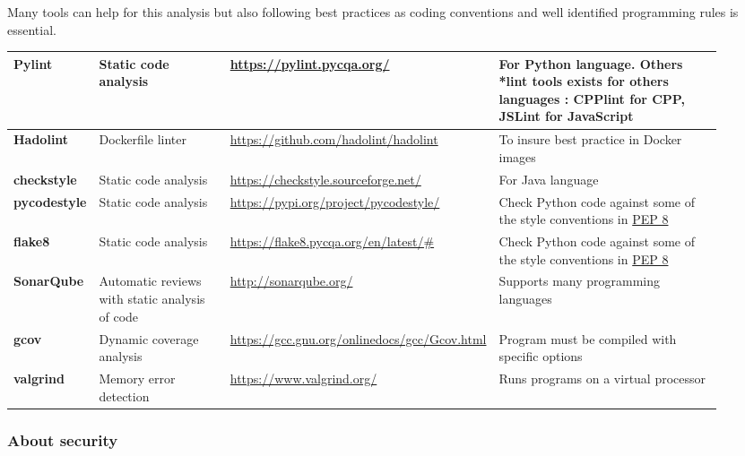 Many tools can help for this analysis but also following best
practices as coding conventions and well identified programming rules
is essential.

\begin{center}
    \tabletail{\hline}
    \label{tab:tools_pack}
    \small
    \begin{supertabular}{|p{0.12\linewidth}|p{0.2\linewidth}|p{0.25\linewidth}|p{0.35\linewidth}|} \hline
    \textbf{Pylint} & Static code analysis & \url{https://pylint.pycqa.org/}
    & For Python language. Others *lint tools exists for others
    languages : CPPlint for CPP, JSLint for JavaScript \\ \hline
    \textbf{Hadolint} & Dockerfile linter & \url{https://github.com/hadolint/hadolint}
    & To insure best practice in Docker images \\ \hline
    \textbf{checkstyle} & Static code analysis & \url{https://checkstyle.sourceforge.net/}
    & For Java language  \\ \hline
    \textbf{pycodestyle} & Static code analysis & \url{https://pypi.org/project/pycodestyle/}
    & Check Python code against some of the style conventions in \href{http://www.python.org/dev/peps/pep-0008/}{PEP 8}  \\ \hline
    \textbf{flake8} & Static code analysis & \url{https://flake8.pycqa.org/en/latest/#}
    & Check Python code against some of the style conventions in \href{http://www.python.org/dev/peps/pep-0008/}{PEP 8} \\ \hline
    \textbf{SonarQube} & Automatic reviews with static analysis of code & \url{http://sonarqube.org/}
    & Supports many programming languages  \\ \hline

    \textbf{gcov} & Dynamic coverage analysis & \url{https://gcc.gnu.org/onlinedocs/gcc/Gcov.html}
    & Program must be compiled with specific options  \\ \hline
    \textbf{valgrind} & Memory error detection & \url{https://www.valgrind.org/}
    & Runs programs on a virtual processor  \\ \hline


\end{supertabular}
\end{center}


\subsubsection{About security}

